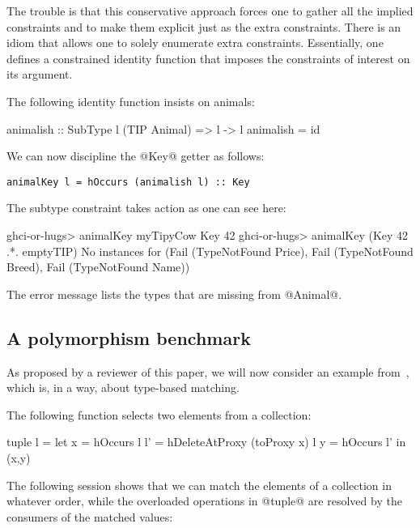 \documentclass[nocopyrightspace,preprint]{sigplan-proc}
\begin{document}
The trouble is that this conservative approach forces one to gather
all the implied constraints and to make them explicit just as the
extra constraints. There is an idiom that allows one to solely
enumerate extra constraints. Essentially, one defines a constrained
identity function that imposes the constraints of interest on its
argument.

The following identity function insists on animals:

\begin{code}
 animalish :: SubType l (TIP Animal) => l -> l
 animalish = id
\end{code}

We can now discipline the @Key@ getter as follows:

\begin{Verbatim}[commandchars=\\\{\}]
 animalKey l = hOccurs (animalish l) :: Key
\end{Verbatim}

The subtype constraint takes action as one can see here:

\begin{code}
 ghci-or-hugs> animalKey myTipyCow
 Key 42
 ghci-or-hugs> animalKey (Key 42 .*. emptyTIP)
 No instances for (Fail (TypeNotFound Price),
                   Fail (TypeNotFound Breed),
                   Fail (TypeNotFound Name))
\end{code}

The error message lists the types that are missing from @Animal@.


\medskip

\subsection*{A polymorphism benchmark}

As proposed by a reviewer of this paper, we will now consider an
example from~\cite{SM01}, which is, in a way, about type-based
matching.

The following function selects two elements from a collection:

\begin{code}
 tuple l = let x  = hOccurs l
               l' = hDeleteAtProxy (toProxy x) l
               y  = hOccurs l'
           in (x,y)
\end{code}

The following session shows that we can match the elements of a
collection in whatever order, while the overloaded operations in
@tuple@ are resolved by the consumers of the matched values:
\end{document}
